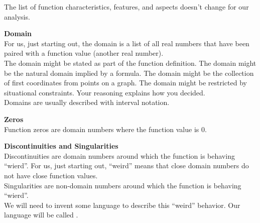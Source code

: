 \documentclass{ximera}
\begin{document}
The list of function characteristics, features, and aspects doesn't change for our analysis. \\





\begin{explanation}  \textbf{\textcolor{blue!75!black}{Domain}} \\

For us, just starting out, the domain is a list of all real numbers that have been paired with a function value (another real number). \\


The domain might be stated as part of the function definition. The domain might be the natural domain implied by a formula.  The domain might be the collection of first coordinates from points on a graph.  The domain might be restricted by situational constraints. Your reasoning explains how you decided. \\


Domains are usually described with interval notation.

\end{explanation}











\begin{explanation}  \textbf{\textcolor{blue!75!black}{Zeros}} \\

Function zeros are domain numbers where the function value is $0$.

\end{explanation}












\begin{explanation}  \textbf{\textcolor{blue!75!black}{Discontinuities and Singularities}} \\

Discontinuities are domain numbers around which the function is behaving ``wierd''. For us, just starting out, ``weird'' means that close domain numbers do not have close function values.   \\




Singularities are non-domain numbers around which the function is behaving ``wierd''.   \\


We will need to invent some language to describe this ``weird'' behavior.  Our language will be called .


\end{explanation}
\end{document}
